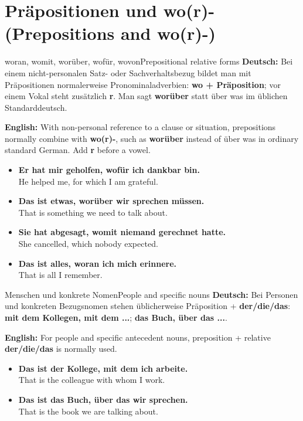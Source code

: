 \documentclass[a4paper,11pt]{article}
\newcommand{\GermanText}[1]{\textbf{Deutsch: }#1\par}
\newcommand{\EnglishText}[1]{{\small\color{SoftGray}\textbf{English: }#1\par}}
\newcommand{\ExampleItem}[2]{\item \textbf{#1}\\{\small\color{SoftGray}#2}}
\begin{document}
   \section{Präpositionen und wo(r)- (Prepositions and wo(r)-)}
                     \begin{grammarentry}{woran, womit, worüber, wofür, wovon}{Prepositional relative forms}
                        \GermanText{Bei einem nicht-personalen Satz- oder Sachverhaltsbezug bildet man mit Präpositionen normalerweise Pronominaladverbien: \textbf{wo + Präposition}; vor einem Vokal steht zusätzlich \textbf{r}. Man sagt \textbf{worüber} statt \glqq über was\grqq{} im üblichen Standarddeutsch.}
                        \EnglishText{With non-personal reference to a clause or situation, prepositions normally combine with \textbf{wo(r)-}, such as \textbf{worüber} instead of \glqq über was\grqq{} in ordinary standard German. Add \textbf{r} before a vowel.}
                     \end{grammarentry}
                     \begin{exbox}\begin{itemize}
                        \ExampleItem{Er hat mir geholfen, wofür ich dankbar bin.}{He helped me, for which I am grateful.}
                        \ExampleItem{Das ist etwas, worüber wir sprechen müssen.}{That is something we need to talk about.}
                        \ExampleItem{Sie hat abgesagt, womit niemand gerechnet hatte.}{She cancelled, which nobody expected.}
                        \ExampleItem{Das ist alles, woran ich mich erinnere.}{That is all I remember.}
                        \end{itemize}\end{exbox}
                        \begin{grammarentry}{Menschen und konkrete Nomen}{People and specific nouns}
                           \GermanText{Bei Personen und konkreten Bezugsnomen stehen üblicherweise Präposition + \textbf{der/die/das}: \textbf{mit dem Kollegen, mit dem ...}; \textbf{das Buch, über das ...}.}
                           \EnglishText{For people and specific antecedent nouns, preposition + relative \textbf{der/die/das} is normally used.}
                        \end{grammarentry}
                        \begin{exbox}\begin{itemize}
                           \ExampleItem{Das ist der Kollege, mit dem ich arbeite.}{That is the colleague with whom I work.}
                           \ExampleItem{Das ist das Buch, über das wir sprechen.}{That is the book we are talking about.}
                           \end{itemize}\end{exbox}
\end{document}
